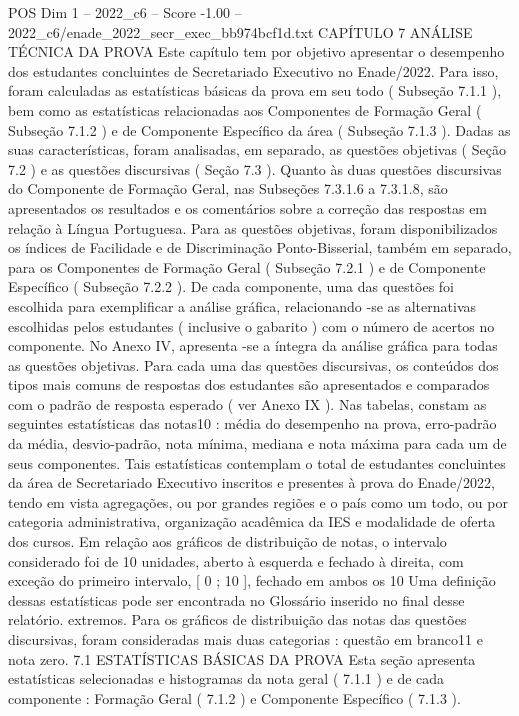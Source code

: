 \begin{textsample}{POS Dim 1 – 2022\_c6 – Score -1.00 – 2022\_c6/enade\_2022\_secr\_exec\_bb974bcf1d.txt}  \label{ex:f1_pos_262}
CAPÍTULO 7 ANÁLISE TÉCNICA DA PROVA Este capítulo tem por objetivo apresentar o desempenho dos estudantes concluintes de Secretariado Executivo no Enade/2022.
Para isso, foram calculadas as estatísticas básicas da prova em seu todo ( Subseção 7.1.1 ), bem como as estatísticas relacionadas aos Componentes de Formação Geral ( Subseção 7.1.2 ) e de Componente Específico da área ( Subseção 7.1.3 ).
Dadas as suas características, foram analisadas, em separado, as questões objetivas ( Seção 7.2 ) e as questões discursivas ( Seção 7.3 ).
Quanto às duas questões discursivas do Componente de Formação Geral, nas Subseções 7.3.1.6 a 7.3.1.8, são apresentados os resultados e os comentários sobre a correção das respostas em relação à Língua Portuguesa.
Para as questões objetivas, foram disponibilizados os índices de Facilidade e de Discriminação Ponto-Bisserial, também em separado, para os Componentes de Formação Geral ( Subseção 7.2.1 ) e de Componente Específico ( Subseção 7.2.2 ).
De cada componente, uma das questões foi escolhida para exemplificar a análise gráfica, relacionando -se as alternativas escolhidas pelos estudantes ( inclusive o gabarito ) com o número de acertos no componente.
No Anexo IV, apresenta -se a íntegra da análise gráfica para todas as questões objetivas.
Para cada uma das questões discursivas, os conteúdos dos tipos mais comuns de respostas dos estudantes são apresentados e comparados com o padrão de resposta esperado ( ver Anexo IX ).
Nas tabelas, constam as seguintes estatísticas das notas10 : média do desempenho na prova, erro-padrão da média, desvio-padrão, nota mínima, mediana e nota máxima para cada um de seus componentes.
Tais estatísticas contemplam o total de estudantes concluintes da área de Secretariado Executivo inscritos e presentes à prova do Enade/2022, tendo em vista agregações, ou por grandes regiões e o país como um todo, ou por categoria administrativa, organização acadêmica da IES e modalidade de oferta dos cursos.
Em relação aos gráficos de distribuição de notas, o intervalo considerado foi de 10 unidades, aberto à esquerda e fechado à direita, com exceção do primeiro intervalo, [ 0 ; 10 ], fechado em ambos os 10 Uma definição dessas estatísticas pode ser encontrada no Glossário inserido no final desse relatório. extremos.
Para os gráficos de distribuição das notas das questões discursivas, foram consideradas mais duas categorias : questão em branco11 e nota zero. 7.1 ESTATÍSTICAS BÁSICAS DA PROVA Esta seção apresenta estatísticas selecionadas e histogramas da nota geral ( 7.1.1 ) e de cada componente : Formação Geral ( 7.1.2 ) e Componente Específico ( 7.1.3 ).

\end{textsample}
